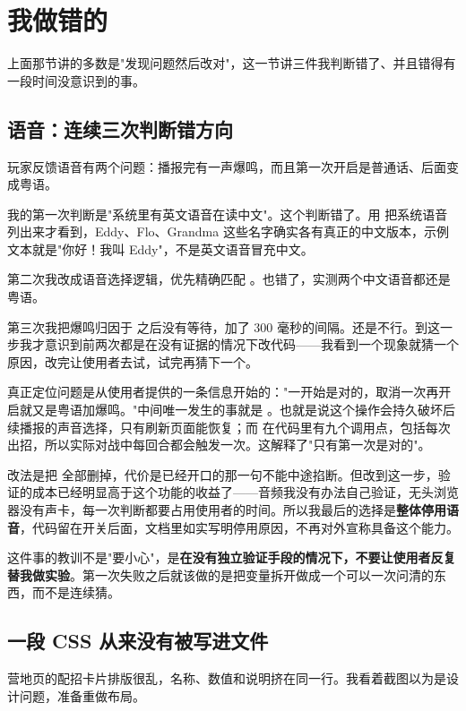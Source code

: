 \section{我做错的}

上面那节讲的多数是"发现问题然后改对"，这一节讲三件我判断错了、并且错得有一段时间没意识到的事。

\subsection{语音：连续三次判断错方向}

玩家反馈语音有两个问题：播报完有一声爆鸣，而且第一次开启是普通话、后面变成粤语。

我的第一次判断是"系统里有英文语音在读中文"。这个判断错了。用  把系统语音列出来才看到，Eddy、Flo、Grandma 这些名字确实各有真正的中文版本，示例文本就是"你好！我叫 Eddy"，不是英文语音冒充中文。

第二次我改成语音选择逻辑，优先精确匹配 。也错了，实测两个中文语音都还是粤语。

第三次我把爆鸣归因于  之后没有等待，加了 300 毫秒的间隔。还是不行。到这一步我才意识到前两次都是在没有证据的情况下改代码——我看到一个现象就猜一个原因，改完让使用者去试，试完再猜下一个。

真正定位问题是从使用者提供的一条信息开始的："一开始是对的，取消一次再开启就又是粤语加爆鸣。"中间唯一发生的事就是 。也就是说这个操作会持久破坏后续播报的声音选择，只有刷新页面能恢复；而  在代码里有九个调用点，包括每次出招，所以实际对战中每回合都会触发一次。这解释了"只有第一次是对的"。

改法是把  全部删掉，代价是已经开口的那一句不能中途掐断。但改到这一步，验证的成本已经明显高于这个功能的收益了——音频我没有办法自己验证，无头浏览器没有声卡，每一次判断都要占用使用者的时间。所以我最后的选择是\textbf{整体停用语音}，代码留在开关后面，文档里如实写明停用原因，不再对外宣称具备这个能力。

这件事的教训不是"要小心"，是\textbf{在没有独立验证手段的情况下，不要让使用者反复替我做实验}。第一次失败之后就该做的是把变量拆开做成一个可以一次问清的东西，而不是连续猜。

\subsection{一段 CSS 从来没有被写进文件}

营地页的配招卡片排版很乱，名称、数值和说明挤在同一行。我看着截图以为是设计问题，准备重做布局。

